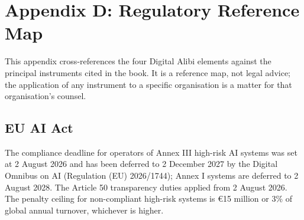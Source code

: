 
\chapter*{Appendix D: Regulatory Reference Map}

This appendix cross-references the four Digital Alibi elements against the principal instruments cited in the book. It is a reference map, not legal advice; the application of any instrument to a specific organisation is a matter for that organisation's counsel.

\section{EU AI Act}

The compliance deadline for operators of Annex III high-risk AI systems was set at 2 August 2026 and has been deferred to 2 December 2027 by the Digital Omnibus on AI (Regulation (EU) 2026/1744); Annex I systems are deferred to 2 August 2028. The Article 50 transparency duties applied from 2 August 2026. The penalty ceiling for non-compliant high-risk systems is €15 million or 3\% of global annual turnover, whichever is higher.

